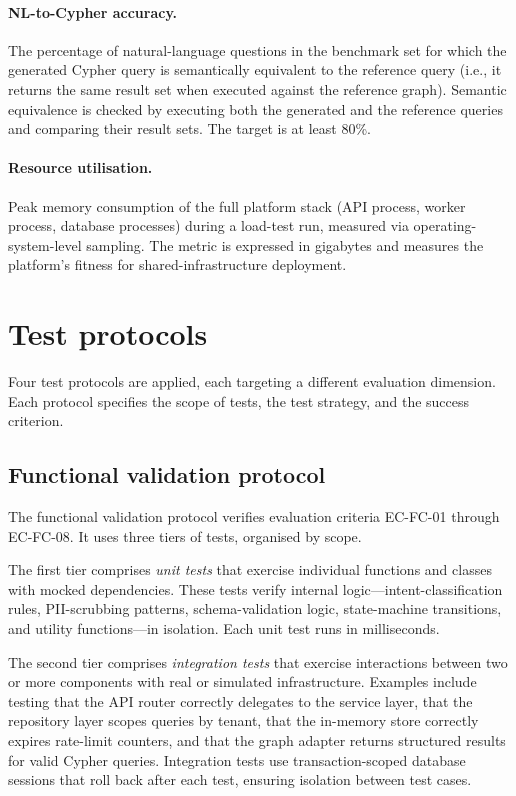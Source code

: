\documentclass[a4paper]{sapthesis}
\begin{document}
\paragraph{NL-to-Cypher accuracy.}
The percentage of natural-language questions in the benchmark set for
which the generated Cypher query is semantically equivalent to the
reference query (i.e., it returns the same result set when executed
against the reference graph).  Semantic equivalence is checked by
executing both the generated and the reference queries and comparing
their result sets.  The target is at least 80\%.

\paragraph{Resource utilisation.}
Peak memory consumption of the full platform stack (API process, worker
process, database processes) during a load-test run, measured via
operating-system-level sampling.  The metric is expressed in gigabytes
and measures the platform's fitness for shared-infrastructure deployment.


\section{Test protocols}
\label{sec:test-protocols}

Four test protocols are applied, each targeting a different evaluation
dimension.  Each protocol specifies the scope of tests, the test
strategy, and the success criterion.

\subsection{Functional validation protocol}
\label{sec:functional-protocol}

The functional validation protocol verifies evaluation criteria EC-FC-01
through EC-FC-08.  It uses three tiers of tests, organised by scope.

The first tier comprises \emph{unit tests} that exercise individual
functions and classes with mocked dependencies.  These tests verify
internal logic---intent-classification rules, PII-scrubbing patterns,
schema-validation logic, state-machine transitions, and utility
functions---in isolation.  Each unit test runs in milliseconds.

The second tier comprises \emph{integration tests} that exercise
interactions between two or more components with real or simulated
infrastructure.  Examples include testing that the API router correctly
delegates to the service layer, that the repository layer scopes queries
by tenant, that the in-memory store correctly expires rate-limit counters,
and that the graph adapter returns structured results for valid Cypher
queries.  Integration tests use transaction-scoped database sessions that
roll back after each test, ensuring isolation between test cases.
\end{document}
